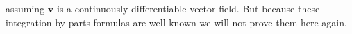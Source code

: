 \documentclass[../main.tex]{subfiles}
\begin{document}
assuming $\mathbf{v}$ is a continuously differentiable vector field. But 
because these integration-by-parts formulas are well known we will not prove
them here again.
\end{document}
